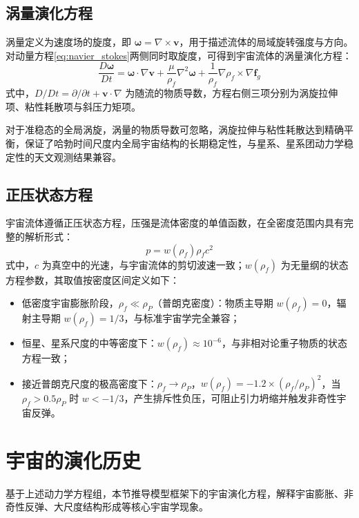 \documentclass[aps,prd,preprint,superscriptaddress,floatfix,numbers,sort&compress]{revtex4-2}
\begin{document}
\subsection{涡量演化方程}
涡量定义为速度场的旋度，即 $\boldsymbol{\omega}=\nabla \times \boldsymbol{v}$，用于描述流体的局域旋转强度与方向。对动量方程\eqref{eq:navier_stokes}两侧同时取旋度，可得到宇宙流体的涡量演化方程：
\begin{equation}
\frac{D \boldsymbol{\omega}}{D t}=\boldsymbol{\omega} \cdot \nabla \boldsymbol{v}+\frac{\mu}{\rho_{f}} \nabla^{2} \boldsymbol{\omega}+\frac{1}{\rho_{f}} \nabla \rho_{f} \times \nabla \boldsymbol{f}_{g}
\label{eq:vorticity}
\end{equation}
式中，$D / D t=\partial / \partial t+\boldsymbol{v} \cdot \nabla$ 为随流的物质导数，方程右侧三项分别为涡旋拉伸项、粘性耗散项与斜压力矩项。

对于准稳态的全局涡旋，涡量的物质导数可忽略，涡旋拉伸与粘性耗散达到精确平衡，保证了哈勃时间尺度内全局宇宙结构的长期稳定性，与星系、星系团动力学稳定性的天文观测结果兼容。

\subsection{正压状态方程}
宇宙流体遵循正压状态方程，压强是流体密度的单值函数，在全密度范围内具有完整的解析形式：
\begin{equation}
p=w\left(\rho_{f}\right) \rho_{f} c^{2}
\label{eq:eos}
\end{equation}
式中，$c$ 为真空中的光速，与宇宙流体的剪切波速一致；$w(\rho_{f})$ 为无量纲的状态方程参数，其取值按密度区间定义如下：
\begin{itemize}
    \item 低密度宇宙膨胀阶段，$\rho_{f} \ll \rho_{P}$（普朗克密度）：物质主导期 $w(\rho_{f})=0$，辐射主导期 $w(\rho_{f})=1/3$，与标准宇宙学完全兼容；
    \item 恒星、星系尺度的中等密度下：$w(\rho_{f}) \approx 10^{-6}$，与非相对论重子物质的状态方程一致；
    \item 接近普朗克尺度的极高密度下：$\rho_{f} \to \rho_{P}$，$w(\rho_{f})=-1.2 \times(\rho_{f} / \rho_{P})^{2}$，当 $\rho_{f}>0.5 \rho_{P}$ 时 $w<-1/3$，产生排斥性负压，可阻止引力坍缩并触发非奇性宇宙反弹。
\end{itemize}

\section{宇宙的演化历史}
基于上述动力学方程组，本节推导模型框架下的宇宙演化方程，解释宇宙膨胀、非奇性反弹、大尺度结构形成等核心宇宙学现象。
\end{document}
